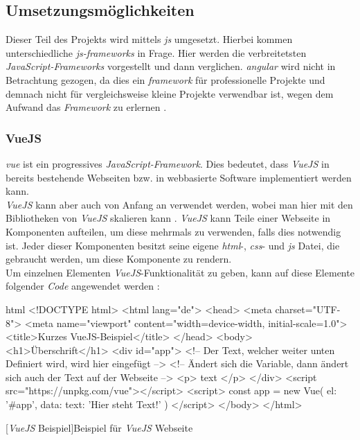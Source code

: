 \subsection{Umsetzungsmöglichkeiten}
Dieser Teil des Projekts wird mittels \textit{\Gls{js}} umgesetzt. Hierbei kommen unterschiedliche \textit{\Gls{js}-\Gls{framework}s} in Frage. Hier werden die verbreitetsten \textit{JavaScript-Frameworks} vorgestellt und dann verglichen. \textit{\Gls{angular}} wird nicht in Betrachtung gezogen, da dies ein \textit{\Gls{framework}} für professionelle Projekte und demnach nicht für vergleichsweise kleine Projekte verwendbar ist, wegen dem Aufwand das \textit{Framework} zu erlernen \cite{angular_ex}.
\subsubsection{VueJS}
\textit{\Gls{vue}} ist ein progressives \textit{JavaScript-Framework}. Dies bedeutet, dass \textit{VueJS} in bereits bestehende Webseiten bzw. in webbasierte Software implementiert werden kann.\\
\textit{VueJS} kann aber auch von Anfang an verwendet werden, wobei man hier mit den Bibliotheken von \textit{VueJS} skalieren kann \cite{vuedoc}. \textit{VueJS} kann Teile einer Webseite in Komponenten aufteilen, um diese mehrmals zu verwenden, falls dies notwendig ist. Jeder dieser Komponenten besitzt seine eigene \textit{\Gls{html}}-, \textit{\Gls{css}}- und \textit{\Gls{js}} Datei, die gebraucht werden, um diese Komponente zu rendern.\\
Um einzelnen Elementen \textit{VueJS}-Funktionalität zu geben, kann auf diese Elemente folgender \textit{Code} angewendet werden \cite{vuedoc}:
\begin{code}{html}
	<!DOCTYPE html>
	<html lang="de">
		<head>
			<meta charset="UTF-8">
			<meta name="viewport" content="width=device-width, initial-scale=1.0">
			<title>Kurzes VueJS-Beispiel</title>
		</head>
		<body>
			<h1>Überschrift</h1>
			<div id="app">
				<!-- Der Text, welcher weiter unten Definiert wird, wird hier eingefügt -->
				<!-- Ändert sich die Variable, dann ändert sich auch der Text auf der Webseite -->
				<p> {{ text }} </p>
			</div>
			<script src="https://unpkg.com/vue"></script>
			<script>
				const app = new Vue({
					el: '#app',
					data: {
						text: 'Hier steht Text!'
					}
				})
			</script>
		</body>
	</html>
\end{code}
[\textit{VueJS} Beispiel]{Beispiel für \textit{VueJS} Webseite}~\\
